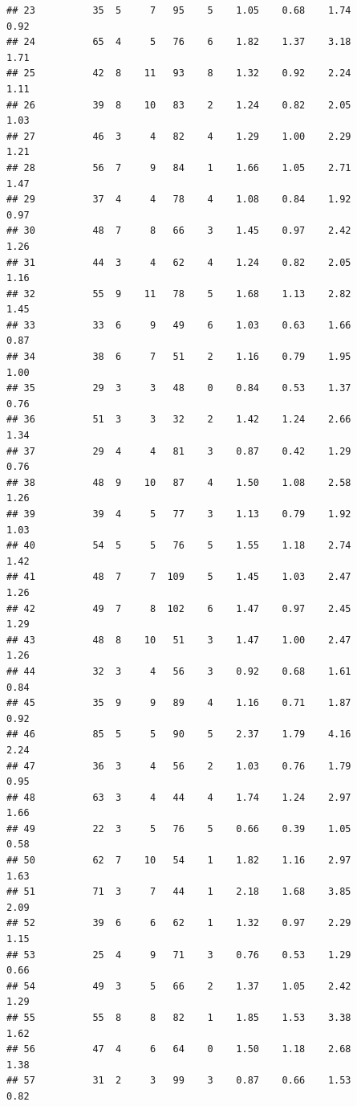 \documentclass[
]{book}
\theoremstyle{definition}
\theoremstyle{definition}
\theoremstyle{definition}
\theoremstyle{definition}
\theoremstyle{remark}
\begin{document}
\begin{verbatim}
## 23          35  5     7   95    5    1.05    0.68    1.74           0.92
## 24          65  4     5   76    6    1.82    1.37    3.18           1.71
## 25          42  8    11   93    8    1.32    0.92    2.24           1.11
## 26          39  8    10   83    2    1.24    0.82    2.05           1.03
## 27          46  3     4   82    4    1.29    1.00    2.29           1.21
## 28          56  7     9   84    1    1.66    1.05    2.71           1.47
## 29          37  4     4   78    4    1.08    0.84    1.92           0.97
## 30          48  7     8   66    3    1.45    0.97    2.42           1.26
## 31          44  3     4   62    4    1.24    0.82    2.05           1.16
## 32          55  9    11   78    5    1.68    1.13    2.82           1.45
## 33          33  6     9   49    6    1.03    0.63    1.66           0.87
## 34          38  6     7   51    2    1.16    0.79    1.95           1.00
## 35          29  3     3   48    0    0.84    0.53    1.37           0.76
## 36          51  3     3   32    2    1.42    1.24    2.66           1.34
## 37          29  4     4   81    3    0.87    0.42    1.29           0.76
## 38          48  9    10   87    4    1.50    1.08    2.58           1.26
## 39          39  4     5   77    3    1.13    0.79    1.92           1.03
## 40          54  5     5   76    5    1.55    1.18    2.74           1.42
## 41          48  7     7  109    5    1.45    1.03    2.47           1.26
## 42          49  7     8  102    6    1.47    0.97    2.45           1.29
## 43          48  8    10   51    3    1.47    1.00    2.47           1.26
## 44          32  3     4   56    3    0.92    0.68    1.61           0.84
## 45          35  9     9   89    4    1.16    0.71    1.87           0.92
## 46          85  5     5   90    5    2.37    1.79    4.16           2.24
## 47          36  3     4   56    2    1.03    0.76    1.79           0.95
## 48          63  3     4   44    4    1.74    1.24    2.97           1.66
## 49          22  3     5   76    5    0.66    0.39    1.05           0.58
## 50          62  7    10   54    1    1.82    1.16    2.97           1.63
## 51          71  3     7   44    1    2.18    1.68    3.85           2.09
## 52          39  6     6   62    1    1.32    0.97    2.29           1.15
## 53          25  4     9   71    3    0.76    0.53    1.29           0.66
## 54          49  3     5   66    2    1.37    1.05    2.42           1.29
## 55          55  8     8   82    1    1.85    1.53    3.38           1.62
## 56          47  4     6   64    0    1.50    1.18    2.68           1.38
## 57          31  2     3   99    3    0.87    0.66    1.53           0.82

\end{verbatim}
\end{document}
